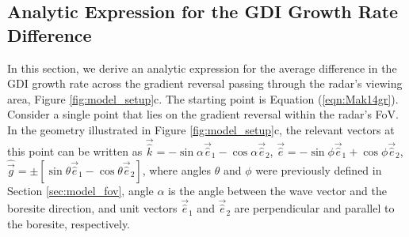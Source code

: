 \begin{subappendices}
\section{Analytic Expression for the GDI Growth Rate Difference}
\label{sec:p2appendix}


In this section, we derive an analytic expression for the average difference in the GDI growth rate across the gradient reversal passing through the radar's viewing area, Figure \ref{fig:model_setup}c. The starting point is Equation (\ref{eqn:Mak14gr}). Consider a single point that lies on the gradient reversal within the radar's FoV. In the geometry illustrated in Figure \ref{fig:model_setup}c, the relevant vectors at this point can be written as \(\vec{\hat k}=-\sin\alpha\vec{\hat{e}}_1-\cos\alpha\vec{\hat{e}}_2\), \(\vec{\hat e}=-\sin\phi\vec{\hat{e}}_1+\cos\phi\vec{\hat{e}}_2\), \(\hat{\vec{g}}=\pm[\sin\theta\vec{\hat{e}}_1-\cos\theta\vec{\hat{e}}_2]\), where angles \(\theta\) and \(\phi\) were previously defined in Section \ref{sec:model_fov}, angle \(\alpha\) is the angle between the wave vector and the boresite direction, and unit vectors \(\vec{\hat{e}}_1\)  and \(\vec{\hat{e}}_2\) are  perpendicular and parallel to the boresite, respectively.



\end{subappendices}
